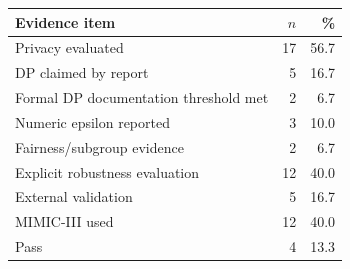 \begin{tabular}{lrr}
\toprule
Evidence item & $n$ & \% \\
\midrule
Privacy evaluated & 17 & 56.7 \\
DP claimed by report & 5 & 16.7 \\
Formal DP documentation threshold met & 2 & 6.7 \\
Numeric epsilon reported & 3 & 10.0 \\
Fairness/subgroup evidence & 2 & 6.7 \\
Explicit robustness evaluation & 12 & 40.0 \\
External validation & 5 & 16.7 \\
MIMIC-III used & 12 & 40.0 \\
Pass & 4 & 13.3 \\
\bottomrule
\end{tabular}
